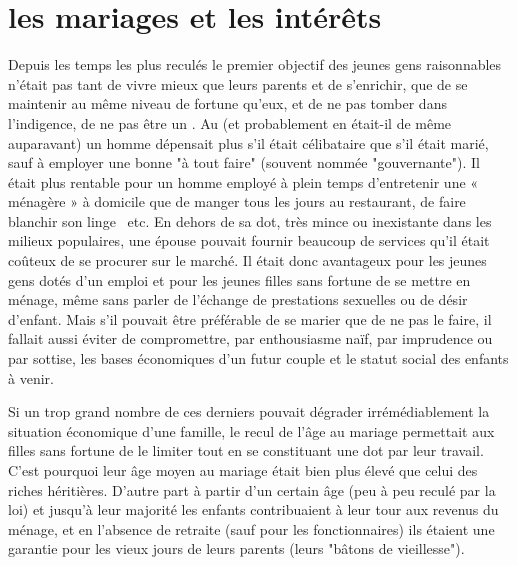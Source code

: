 \section{les mariages et les intérêts}
 
 Depuis les temps les plus reculés le premier objectif des jeunes gens raisonnables n'était pas tant de vivre mieux que leurs parents et de s'enrichir, que de se maintenir au même niveau de fortune qu'eux, et de ne pas tomber dans l'indigence, de ne pas être un . Au  (et probablement en était-il de même auparavant) un homme dépensait plus s'il était célibataire que s'il était marié, sauf à employer une bonne "à tout faire" (souvent nommée "gouvernante"). Il était plus rentable pour un homme employé à plein temps d'entretenir une « ménagère » à domicile que de manger tous les jours au restaurant, de faire blanchir son linge ~etc. En dehors de sa dot, très mince ou inexistante dans les milieux populaires, une épouse pouvait fournir beaucoup de services qu'il était coûteux de se procurer sur le marché. Il était donc avantageux pour les jeunes gens dotés d'un emploi et pour les jeunes filles sans fortune de se mettre en ménage, même sans parler de l'échange de prestations sexuelles ou de désir d'enfant. Mais s'il pouvait être préférable de se marier que de ne pas le faire, il fallait aussi éviter de compromettre, par enthousiasme naïf, par imprudence ou par sottise, les bases économiques d'un futur couple et le statut social des enfants à venir. 
 
 Si un trop grand nombre de ces derniers pouvait dégrader irrémédiablement la situation économique d'une famille, le recul de l'âge au mariage permettait aux filles sans fortune de le limiter tout en se constituant une dot par leur travail. C'est pourquoi leur âge moyen au mariage était bien plus élevé que celui des riches héritières. D'autre part à partir d'un certain âge (peu à peu reculé par la loi) et jusqu'à leur majorité les enfants contribuaient à leur tour aux revenus du ménage, et en l'absence de retraite (sauf pour les fonctionnaires) ils étaient une garantie pour les vieux jours de leurs parents (leurs "bâtons de vieillesse"). 

